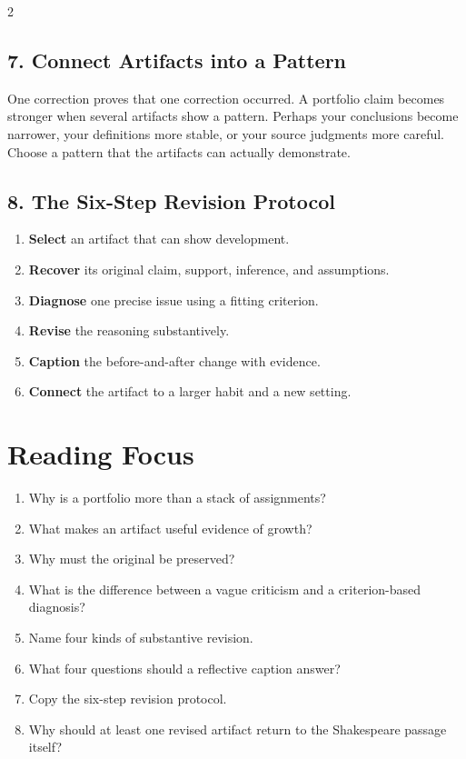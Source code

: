 \documentclass[12pt]{article}
\begin{document}
\begin{multicols}{2}
\subsection*{7. Connect Artifacts into a Pattern}
One correction proves that one correction occurred. A portfolio claim becomes stronger when several artifacts show a pattern. Perhaps your conclusions become narrower, your definitions more stable, or your source judgments more careful. Choose a pattern that the artifacts can actually demonstrate.

\subsection*{8. The Six-Step Revision Protocol}
\begin{enumerate}[leftmargin=*,itemsep=0.12em]
\item \textbf{Select} an artifact that can show development.
\item \textbf{Recover} its original claim, support, inference, and assumptions.
\item \textbf{Diagnose} one precise issue using a fitting criterion.
\item \textbf{Revise} the reasoning substantively.
\item \textbf{Caption} the before-and-after change with evidence.
\item \textbf{Connect} the artifact to a larger habit and a new setting.
\end{enumerate}

\section*{Reading Focus}
\begin{enumerate}[leftmargin=*]
\item Why is a portfolio more than a stack of assignments?
\item What makes an artifact useful evidence of growth?
\item Why must the original be preserved?
\item What is the difference between a vague criticism and a criterion-based diagnosis?
\item Name four kinds of substantive revision.
\item What four questions should a reflective caption answer?
\item Copy the six-step revision protocol.
\item Why should at least one revised artifact return to the Shakespeare passage itself?
\end{enumerate}


\end{multicols}
\end{document}
